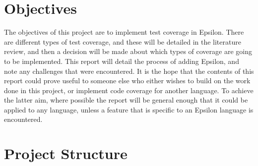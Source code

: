 \section{Objectives}

The objectives of this project are to implement test coverage in Epsilon. There are different types of test coverage, and these will be detailed in the literature review, and then a decision will be made about which types of coverage are going to be implemented. This report will detail the process of adding Epsilon, and note any challenges that were encountered. It is the hope that the contents of this report could prove useful to someone else who either wishes to build on the work done in this project, or implement code coverage for another language. To achieve the latter aim, where possible the report will be general enough that it could be applied to any language, unless a feature that is specific to an Epsilon language is encountered.

\section{Project Structure}

